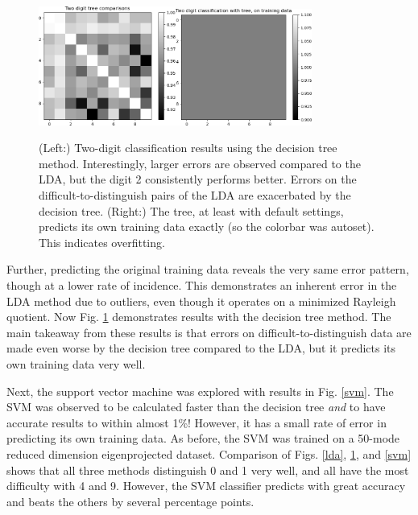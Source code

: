 \documentclass{article}
\begin{document}
\begin{figure}[ht!]
  \centering
  \includegraphics[width=0.4\textwidth]{2dgt_tree_50modes}\quad\quad\quad\includegraphics[width=0.4\textwidth]{ontrainingdata/tree_training}
  \caption{(Left:) Two-digit classification results using the decision tree method. Interestingly, larger errors are observed compared to the LDA, but the digit 2 consistently performs better. Errors on the difficult-to-distinguish pairs of the LDA are exacerbated by the decision tree. (Right:) The tree, at least with default settings, predicts its own training data exactly (so the colorbar was autoset). This indicates overfitting.}\label{tree}
\end{figure}

Further, predicting the original training data reveals the very same error pattern, though at a lower rate of incidence. This demonstrates an inherent error in the LDA method due to outliers, even though it operates on a minimized Rayleigh quotient. Now Fig. \ref{tree} demonstrates results with the decision tree method. The main takeaway from these results is that errors on difficult-to-distinguish data are made even worse by the decision tree compared to the LDA, but it predicts its own training data very well.

Next, the support vector machine was explored with results in Fig. \ref{svm}. The SVM was observed to be calculated faster than the decision tree \textit{and} to have accurate results to within almost 1\%! However, it has a small rate of error in predicting its own training data. As before, the SVM was trained on a 50-mode reduced dimension eigenprojected dataset. Comparison of Figs. \ref{lda}, \ref{tree}, and \ref{svm} shows that all three methods distinguish 0 and 1 very well, and all have the most difficulty with 4 and 9. However, the SVM classifier predicts with great accuracy and beats the others by several percentage points.
\end{document}
